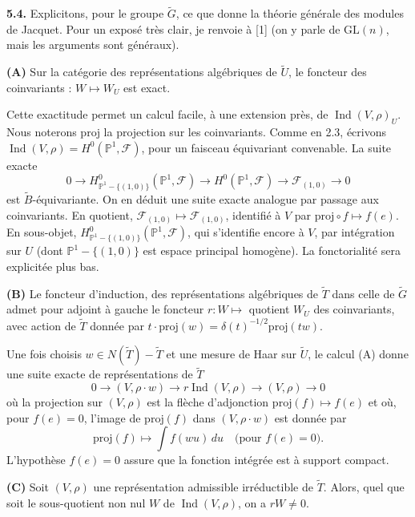 \documentclass[12pt,a4paper]{article}
\theoremstyle{plain}
\theoremstyle{definition}
\theoremstyle{remark}
\DeclareMathOperator{\Ind}{Ind}
\newcommand{\wt}{\widetilde}
\newcommand{\cF}{\mathscr{F}}
\newcommand{\PP}{\mathbb{P}}
\providecommand{\PP}{\mathbb{P}}
\providecommand{\cF}{\mathcal{F}}
\begin{document}
\textbf{5.4.} Explicitons, pour le groupe $\wt{G}$, ce que donne la théorie générale des modules de Jacquet. Pour un exposé très clair, je renvoie à [1] (on y parle de $\mathrm{GL}(n)$, mais les arguments sont généraux).

\textbf{(A)} Sur la catégorie des représentations algébriques de $\wt{U}$, le foncteur des coinvariants : $W \mapsto W_U$ est exact.

Cette exactitude permet un calcul facile, à une extension près, de $\Ind(V, \rho)_U$. Nous noterons $\mathrm{proj}$ la projection sur les coinvariants. Comme en 2.3, écrivons $\Ind(V, \rho) = H^0(\PP^1, \cF)$, pour un faisceau équivariant convenable. La suite exacte
\[
0 \longrightarrow H^0_{\PP^1 - \{(1,0)\}}(\PP^1, \cF) \longrightarrow H^0(\PP^1, \cF) \longrightarrow \cF_{(1,0)} \longrightarrow 0
\]
est $\wt{B}$-équivariante. On en déduit une suite exacte analogue par passage aux coinvariants. En quotient, $\cF_{(1,0)} \mapsto \cF_{(1,0)}$, identifié à $V$ par $\mathrm{proj} \circ f \mapsto f(e)$. En sous-objet, $H^0_{\PP^1 - \{(1,0)\}}(\PP^1, \cF)$, qui s'identifie encore à $V$, par intégration sur $U$ (dont $\PP^1 - \{(1,0)\}$ est espace principal homogène). La fonctorialité sera explicitée plus bas.

\textbf{(B)} Le foncteur d'induction, des représentations algébriques de $\wt{T}$ dans celle de $\wt{G}$ admet pour adjoint à gauche le foncteur $r : W \mapsto$ quotient $W_U$ des coinvariants, avec action de $\wt{T}$ donnée par $t \cdot \mathrm{proj}(w) = \delta(t)^{-1/2} \mathrm{proj}(tw)$.

Une fois choisis $w \in N(\wt{T}) - \wt{T}$ et une mesure de Haar sur $\wt{U}$, le calcul (A) donne une suite exacte de représentations de $\wt{T}$
\begin{equation}\label{eq:5.4.1}
0 \longrightarrow (V, \rho \cdot w) \longrightarrow r \Ind(V, \rho) \longrightarrow (V, \rho) \longrightarrow 0
\tag{5.4.1}
\end{equation}
où la projection sur $(V, \rho)$ est la flèche d'adjonction $\mathrm{proj}(f) \mapsto f(e)$ et où, pour $f(e) = 0$, l'image de $\mathrm{proj}(f)$ dans $(V, \rho \cdot w)$ est donnée par
\begin{equation}\label{eq:5.4.2}
\mathrm{proj}(f) \longmapsto \int f(wu) \, du \quad \text{(pour } f(e) = 0\text{).}
\tag{5.4.2}
\end{equation}
L'hypothèse $f(e) = 0$ assure que la fonction intégrée est à support compact.

\textbf{(C)} Soit $(V, \rho)$ une représentation admissible irréductible de $\wt{T}$. Alors, quel que soit le sous-quotient non nul $W$ de $\Ind(V, \rho)$, on a $rW \neq 0$.
\end{document}
